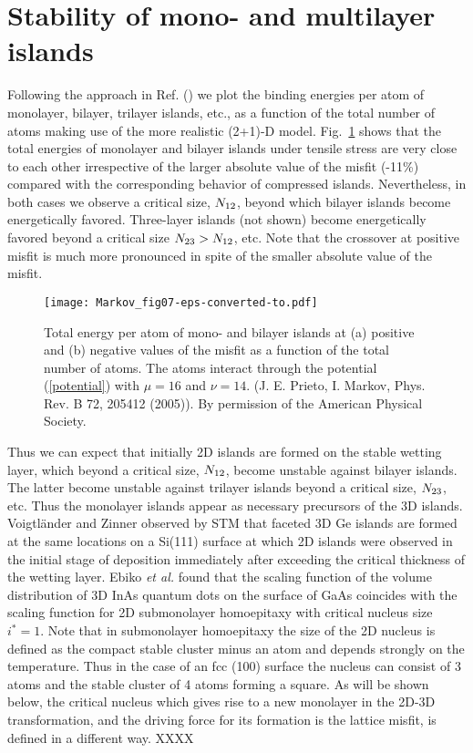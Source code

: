 \documentclass[aps,prl,showpacs,twocolumn,byrevtex,floatfix]{revtex4-1}
\begin{document}
\section{Stability of mono- and multilayer islands}

Following the approach in Ref. () we plot the binding
energies per atom of monolayer, bilayer, trilayer islands, etc., as a function
of the total number of atoms making use of the more realistic (2+1)-D
model.\cite{Prieto05} Fig.\ \ref{mono-bilayer} shows that the total energies of
monolayer and bilayer islands under tensile stress are very close to each other
irrespective of the larger absolute value of the misfit (-11\%) compared with
the corresponding behavior of compressed islands. Nevertheless, in both cases we
observe a critical size, $N_{\rm 12}$, beyond which bilayer islands become
energetically favored. Three-layer islands (not shown) become energetically
favored beyond a critical size $N_{\rm 23} > N_{\rm 12}$, etc. Note that the
crossover at positive misfit is much more pronounced in spite of the
smaller absolute value of the misfit.

\begin{figure}[htb]
\texttt{[image: Markov\_fig07-eps-converted-to.pdf]}
\caption{\label{mono-bilayer} Total energy per atom of mono- and bilayer
islands at (a) positive and (b) negative values of the misfit as a function of
the total number of atoms. The atoms interact through the potential
(\ref{potential}) with $\mu = 16$ and $\nu = 14$. (J. E. Prieto, I. Markov,
Phys. Rev. B 72, 205412 (2005)). By permission of the American Physical
Society.}
\end{figure}




Thus we can expect that initially 2D islands are formed on the stable wetting
layer, which beyond a critical size, $N_{\rm 12}$, become unstable against
bilayer islands. The latter become unstable against trilayer islands beyond a
critical size, $N_{\rm 23}$, etc. Thus the monolayer islands appear as
necessary precursors of the 3D islands.\cite{Priester95,Chen96} Voigtl\"ander
and Zinner observed by STM that faceted 3D Ge
islands are formed at the same locations on a Si(111) surface at which 2D
islands were observed in the initial stage of deposition immediately after
exceeding the critical thickness of the wetting layer.\cite{Voigt93} Ebiko
{\it et al.} found that the scaling function of the volume distribution of 3D
InAs quantum dots on the surface of GaAs coincides with the scaling function for
2D submonolayer homoepitaxy with critical nucleus size $i^* = 1$.\cite{Ebiko99}
Note that in submonolayer homoepitaxy the size of the 2D nucleus is defined as
the compact stable cluster minus an atom and depends strongly on the
temperature. Thus in the case of an fcc (100) surface the nucleus can 
consist of 3 atoms and the stable cluster of 4 atoms forming a
square.\cite{Walton69} As will be shown below, the critical nucleus which gives
rise to a new monolayer in the 2D-3D transformation, and the driving force for
its formation is the lattice misfit, is defined in a different way.
XXXX
\end{document}
